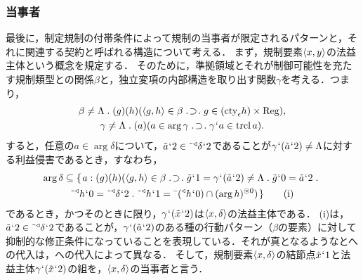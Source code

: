 \subsubsection{当事者}
\label{sssec:当事者}

最後に，制定規制の付帯条件によって規制の当事者が限定されるパターンと，それに関連する契約と呼ばれる構造について考える．
まず，規制要素$ \langle x,y \rangle $の法益主体という概念を規定する．
そのために，準拠領域とそれが制御可能性を充たす規制類型との関係$\beta$と，独立変項の内部構造を取り出す関数$\gamma$を考える．つまり，
\begin{gather*}
    \beta\neq\Lambda\con{1}(g)(h)(\orp{g,h}\in\beta\case{1}{1}{1}g\in(\cty{\epsilon}h)\times\mathrm{Reg}),\\
    \gamma\neq\Lambda\con{1}(a)(a\in\arg \gamma \case{1}{1}{1}\gamma\fap a\in \trcl a).
\end{gather*}
すると，任意の$ a\in\arg \delta $について，$ \tilde{a}{\mspace{1mu}{`}\mspace{1mu}} 2\in\tilde{\:\:}{^\triangleleft}\delta{\mspace{1mu}{`}\mspace{1mu}} 2 $であることが$ \gamma{\mspace{1mu}{`}\mspace{1mu}}(\tilde{a}{\mspace{1mu}{`}\mspace{1mu}} 2)\neq\Lambda $に対する利益侵害であるとき，すなわち，
\begin{multline*}
    \arg \delta \subseteq \classab{a:
        (g)(h)(\orp{g,h}\in\beta\case{1}{1}{1}
            \tilde{g}\fap 1 = \gamma\fap(\tilde{a}\fap 2)\neq\Lambda\con{1}\tilde{g}\fap 0 = \tilde{a}\fap 2\con{1}\\
            \tildel{\trgl{h}}\fap 0 = \tildel{\trgl{\delta}}\fap 2\con{1}\tildel{\trgl{h}}\fap 1 = \barl{(\trgl{h}\fap 0)}\cap\msec{(\arg h)}{0}
        )
    } \tag{i}
\end{multline*}
であるとき，かつそのときに限り，$ \gamma{\mspace{1mu}{`}\mspace{1mu}}(\tilde{x}{\mspace{1mu}{`}\mspace{1mu}} 2) $は$ \langle x,\delta \rangle $の法益主体である．
(i)は，$ \tilde{a}{\mspace{1mu}{`}\mspace{1mu}} 2\in\tilde{\:\:}{^\triangleleft}\delta{\mspace{1mu}{`}\mspace{1mu}} 2 $であることが，$ \gamma{\mspace{1mu}{`}\mspace{1mu}}(\tilde{a}{\mspace{1mu}{`}\mspace{1mu}} 2) $のある種の行動パターン（$\beta$の要素）に対して抑制的な修正条件になっていることを表現している．それが真となるような\kagi{$ \beta $}と\kagi{$ \gamma $}への代入は，\kagi{$ \delta $}への代入によって異なる．
そして，規制要素$ \langle x,\delta \rangle $の結節点$ \tilde{x}{\mspace{1mu}{`}\mspace{1mu}} 1 $と法益主体$ \gamma{\mspace{1mu}{`}\mspace{1mu}}(\tilde{x}{\mspace{1mu}{`}\mspace{1mu}} 2) $の組を，$ \langle x,\delta \rangle $の当事者と言う．


